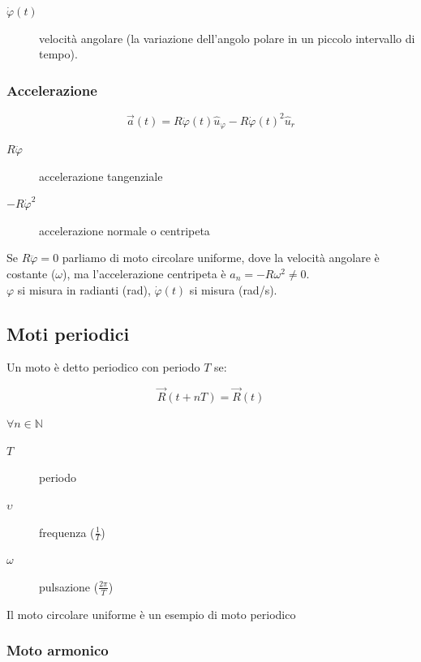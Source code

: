 \documentclass{article}
\begin{document}
\begin{description}
    \item[$\dot{\varphi}(t)$] velocità angolare (la variazione dell'angolo polare in un piccolo intervallo di tempo).
\end{description}

\subsubsection{Accelerazione}

$$
\vec{a}(t) = R \ddot{\varphi}(t)\hat{u}_\varphi - R \dot{\varphi}(t)^2\hat{u}_r
$$

\begin{description}
    \item[$R\ddot{\varphi}$] accelerazione tangenziale
    \item[$-R\dot{\varphi}^2$] accelerazione normale o centripeta
\end{description}

\noindent
Se $R\ddot{\varphi} = 0$ parliamo di moto circolare uniforme,
dove la velocità angolare è costante ($\omega$),
ma l'accelerazione centripeta è $a_n = -R \omega^2 \neq 0$.\\

\noindent
$\varphi$ si misura in radianti (rad), $\dot{\varphi}(t)$ si misura (rad/s).

\subsection{Moti periodici}

Un moto è detto periodico con periodo $T$ se:

$$
\vec{R}(t+nT) = \vec{R}(t)
$$

\noindent
$\forall n \in \mathbb{N}$

\begin{description}
    \item[$T$] periodo
    \item[$\upsilon$] frequenza ($\frac{1}{T}$)
    \item[$\omega$] pulsazione ($\frac{2\pi}{T}$)
\end{description}

\noindent
Il moto circolare uniforme è un esempio di moto periodico

\subsubsection{Moto armonico}
\end{document}
